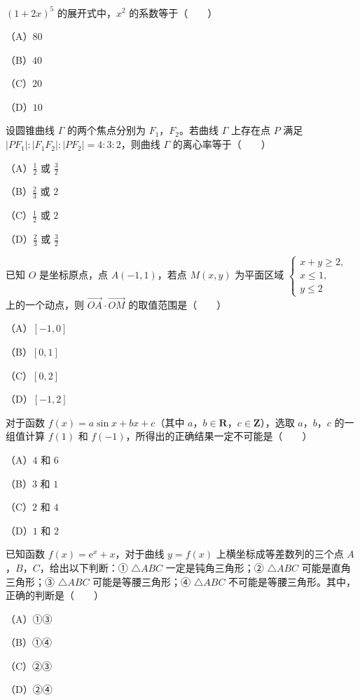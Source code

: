 \begin{question}
$(1+2x)^5$ 的展开式中，$x^2$ 的系数等于\mbox{（　　）}

（A）$80$

（B）$40$

（C）$20$

（D）$10$

\end{question}
\begin{question}
设圆锥曲线 $\Gamma$ 的两个焦点分别为 $F_1$，$F_2$。若曲线 $\Gamma$ 上存在点 $P$ 满足 $|PF_1|:|F_1F_2|:|PF_2|=4:3:2$，则曲线 $\Gamma$ 的离心率等于\mbox{（　　）}

（A）$\frac12$ 或 $\frac32$

（B）$\frac23$ 或 $2$

（C）$\frac12$ 或 $2$

（D）$\frac23$ 或 $\frac32$

\end{question}
\begin{question}
已知 $O$ 是坐标原点，点 $A(-1,1)$，若点 $M(x,y)$ 为平面区域 $\begin{cases}x+y\geqslant2,\\x\leqslant1,\\y\leqslant2\end{cases}$ 上的一个动点，则 $\overrightarrow{OA}\cdot\overrightarrow{OM}$ 的取值范围是\mbox{（　　）}

（A）$[-1,0]$

（B）$[0,1]$

（C）$[0,2]$

（D）$[-1,2]$

\end{question}
\begin{question}
对于函数 $f(x)=a\sin x+bx+c$（其中 $a$，$b\in\mathbf R$，$c\in\mathbf Z$），选取 $a$，$b$，$c$ 的一组值计算 $f(1)$ 和 $f(-1)$，所得出的正确结果一定不可能是\mbox{（　　）}

（A）$4$ 和 $6$

（B）$3$ 和 $1$

（C）$2$ 和 $4$

（D）$1$ 和 $2$

\end{question}
\begin{question}
已知函数 $f(x)=\mathrm e^x+x$，对于曲线 $y=f(x)$ 上横坐标成等差数列的三个点 $A$，$B$，$C$，给出以下判断：① $\triangle ABC$ 一定是钝角三角形；② $\triangle ABC$ 可能是直角三角形；③ $\triangle ABC$ 可能是等腰三角形；④ $\triangle ABC$ 不可能是等腰三角形。其中，正确的判断是\mbox{（　　）}

（A）①③

（B）①④

（C）②③

（D）②④

\end{question}

